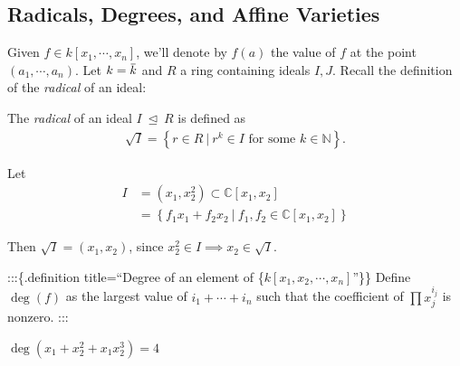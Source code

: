 \hypertarget{radicals-degrees-and-affine-varieties}{%
\subsection{Radicals, Degrees, and Affine
Varieties}\label{radicals-degrees-and-affine-varieties}}

Given \(f\in k[x_1, \cdots, x_n]\), we'll denote by \(f(a)\) the value
of \(f\) at the point \((a_1, \cdots, a_n)\). Let
\(k = \mkern 1.5mu\overline{\mkern-1.5muk\mkern-1.5mu}\mkern 1.5mu\) and
\(R\) a ring containing ideals \(I, J\). Recall the definition of the
\emph{radical} of an ideal:

\begin{definition}[Radical]

The \emph{radical} of an ideal \(I {~\trianglelefteq~}R\) is defined as
\begin{align*}  
\sqrt{I} = \left\{{r\in R {~\mathrel{\Big|}~}r^k\in I \text{ for some } k\in {\mathbb{N}}}\right\}
.\end{align*}

\end{definition}

\begin{example}

Let
\begin{align*}
I &= (x_1, x_2^2) \subset {\mathbb{C}}[x_1, x_2] \\
  &= \left\{{ f_1 x_1 + f_2 x_2 {~\mathrel{\Big|}~}f_1, f_2 \in {\mathbb{C}}[x_1, x_2]}\right\}
\end{align*}

Then \(\sqrt{I} = (x_1, x_2)\), since
\(x_2^2 \in I \implies x_2 \in \sqrt{I}\).

\end{example}

:::\{.definition title=``Degree of an element of
\{\(k[x_1, x_2, \cdots, x_n]\)''\}\} Define \(\deg(f)\) as the largest
value of \(i_1 + \cdots + i_n\) such that the coefficient of
\(\prod x_j ^{i_j}\) is nonzero. :::

\begin{example}

\(\deg(x_1 + x_2^2 + x_1 x_2^3) = 4\)

\end{example}

